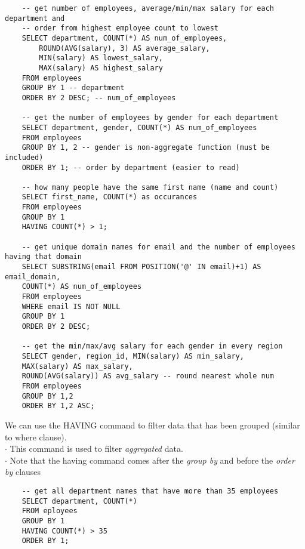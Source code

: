 \documentclass[11pt, a4paper]{article}
\begin{document}
\begin{spacing}{1.1}
\begin{lstlisting}
	-- get number of employees, average/min/max salary for each department and
	-- order from highest employee count to lowest
	SELECT department, COUNT(*) AS num_of_employees,
		ROUND(AVG(salary), 3) AS average_salary,
		MIN(salary) AS lowest_salary,
		MAX(salary) AS highest_salary
	FROM employees
	GROUP BY 1 -- department
	ORDER BY 2 DESC; -- num_of_employees 
	
	-- get the number of employees by gender for each department
	SELECT department, gender, COUNT(*) AS num_of_employees
	FROM employees
	GROUP BY 1, 2 -- gender is non-aggregate function (must be included)
	ORDER BY 1; -- order by department (easier to read) 
	
	-- how many people have the same first name (name and count)
	SELECT first_name, COUNT(*) as occurances
	FROM employees
	GROUP BY 1
	HAVING COUNT(*) > 1;
	
	-- get unique domain names for email and the number of employees having that domain
	SELECT SUBSTRING(email FROM POSITION('@' IN email)+1) AS email_domain, 
	COUNT(*) AS num_of_employees
	FROM employees
	WHERE email IS NOT NULL
	GROUP BY 1
	ORDER BY 2 DESC;
	
	-- get the min/max/avg salary for each gender in every region
	SELECT gender, region_id, MIN(salary) AS min_salary, 
	MAX(salary) AS max_salary, 
	ROUND(AVG(salary)) AS avg_salary -- round nearest whole num
	FROM employees
	GROUP BY 1,2
	ORDER BY 1,2 ASC; \end{lstlisting} \vspace*{1mm}
	We can use the HAVING command to filter data that has been grouped (similar to where clause). \\
	\hspace*{3mm} $\cdot$ This command is used to filter \textit{aggregated} data. \\
	\hspace*{3mm} $\cdot$ Note that the having command comes after the \textit{group by} and before the \textit{order by} clauses
	\begin{lstlisting}
	-- get all department names that have more than 35 employees
	SELECT department, COUNT(*) 
	FROM eployees
	GROUP BY 1
	HAVING COUNT(*) > 35
	ORDER BY 1;	\end{lstlisting} \newpage


\end{spacing}
\end{document}
